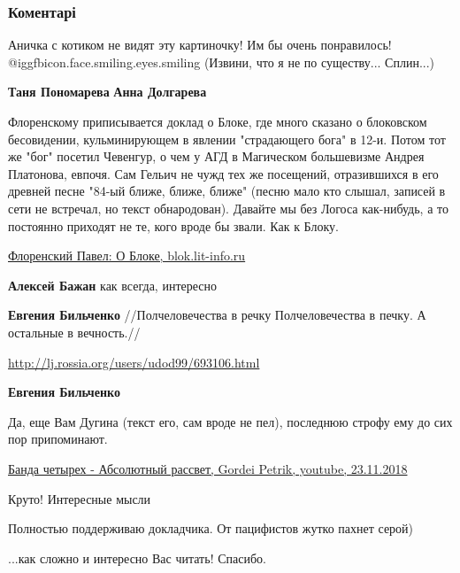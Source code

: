  
 
 
 
 
\subsubsection{Коментарі}
\label{sec:14_11_2021.fb.bilchenko_evgenia.1.pochemu_ja_ne_pacifist.cmt}

\begin{itemize} %

Аничка с котиком не видят эту картиночку! Им бы очень понравилось!
@igg{fbicon.face.smiling.eyes.smiling}  (Извини, что я не по существу...
Сплин...)

\textbf{Таня Пономарева} \textbf{Анна Долгарева}


Флоренскому приписывается доклад о Блоке, где много сказано о блоковском
бесовидении, кульминирующем в явлении "страдающего бога" в 12-и. Потом тот же
"бог" посетил Чевенгур, о чем у АГД в Магическом большевизме Андрея Платонова,
евпочя. Сам Гельич не чужд тех же посещений, отразившихся в его древней песне
"84-ый ближе, ближе, ближе" (песню мало кто слышал, записей в сети не встречал,
но текст обнародован). Давайте мы без Логоса как-нибудь, а то постоянно
приходят не те, кого вроде бы звали. Как к Блоку.

\href{http://blok.lit-info.ru/blok/kritika-o-bloke/florenskij-pavel-o-bloke.htm}{%
Флоренский Павел: О Блоке, blok.lit-info.ru%
}

\begin{itemize} %
\textbf{Алексей Бажан} как всегда, интересно

\textbf{Евгения Бильченко} 
//Полчеловечества в речку
Полчеловечества в печку.
А остальные в вечность.//

\url{http://lj.rossia.org/users/udod99/693106.html}

\textbf{Евгения Бильченко} 

Да, еще Вам Дугина (текст его, сам вроде не пел), последнюю строфу ему до сих
пор припоминают. 

\href{https://www.youtube.com/watch?v=KKG5MgWcG5I}{%
Банда четырех - Абсолютный рассвет, Gordei Petrik, youtube, 23.11.2018%
}

\end{itemize} %

Круто! Интересные мысли

Полностью поддерживаю докладчика. От пацифистов жутко пахнет серой)

...как сложно и интересно Вас читать! Спасибо.

\end{itemize} %
